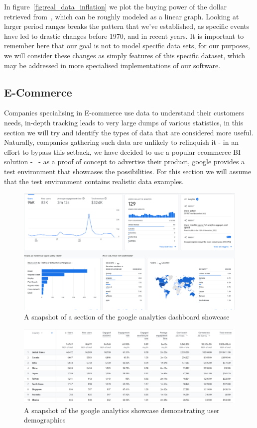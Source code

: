 In figure~\ref{fig:real_data_inflation} we plot the buying power of the dollar retrieved
from~\cite{officialdataCPIInflationUS}, which can be roughly modeled as a linear graph.
Looking at larger period ranges breaks the pattern that we've established, as specific events have led to drastic
changes before 1970, and in recent years.
It is important to remember here that our goal is not to model specific data sets, for our purposes, we will consider
these changes as simply features of this specific dataset, which may be addressed in more specialised implementations of
our software.

\subsection{E-Commerce}

Companies specialising in E-commerce use data to understand their customers needs, in-depth tracking leads to very large
dumps of various statistics, in this section we will try and identify the types of data that are considered more useful.
Naturally, companies gathering such data are unlikely to relinquish it - in an effort to bypass this setback, we have
decided to use a popular ecommerce BI solution -~\cite{GoogleAnalytics} - as a proof of concept to advertise their
product, google provides a test environment that showcases the possibilities.
For this section we will assume that the test environment contains realistic data examples.

\begin{figure}
    \centering
    \includegraphics[width=12cm]{figures/real_data_examples/google_analytics_dashboard}
    \caption{A snapshot of a section of the google analytics dashboard showcase}
    \label{fig:google_analytics_dashboard}
\end{figure}

\begin{figure}
    \centering
    \includegraphics[width=12cm]{figures/real_data_examples/google_analytics_user_demographics}
    \caption{A snapshot of the google analytics showcase demonstrating user demographics}
    \label{fig:google_analytics_demographics}
\end{figure}

